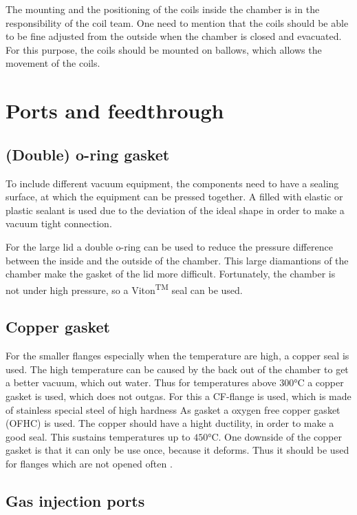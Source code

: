 The mounting and the positioning of the coils inside the chamber is in the responsibility of the coil team.
One need to mention that the coils should be able to be fine adjusted from the outside when the chamber is closed and evacuated.
For this purpose, the coils should be mounted on ballows, which allows the movement of the coils.


\section{Ports and feedthrough}

\subsection{(Double) o-ring gasket}

To include different vacuum equipment, the components need to have a sealing surface, at which the equipment can be pressed together.
A filled with elastic or plastic sealant is used due to the deviation of the ideal shape in order to make a vacuum tight connection. \cite{Wutz2000}

For the large lid a double o-ring can be used to reduce the pressure difference between the inside and the outside of the chamber.
This large diamantions of the chamber make the gasket of the lid more difficult.
Fortunately, the chamber is not under high pressure, so a Viton\textsuperscript{TM} seal can be used.


\subsection{Copper gasket}
For the smaller flanges especially when the temperature are high, a copper seal is used.
The high temperature can be caused by the back out of the chamber to get a better vacuum, which out water.
Thus for temperatures above $300\si{\degreeCelsius}$ a copper gasket is used, which does not outgas.
For this a CF-flange is used, which is made of stainless special steel of high hardness
As gasket a oxygen free copper gasket (OFHC) is used.
The copper should have a hight ductility, in order to make a good seal.
This sustains temperatures up to $450\si{\degreeCelsius}$.
One downside of the copper gasket is that it can only be use once, because it deforms.
Thus it should be used for flanges which are not opened often \cite{Wutz2000}.




\subsection{Gas injection ports}

